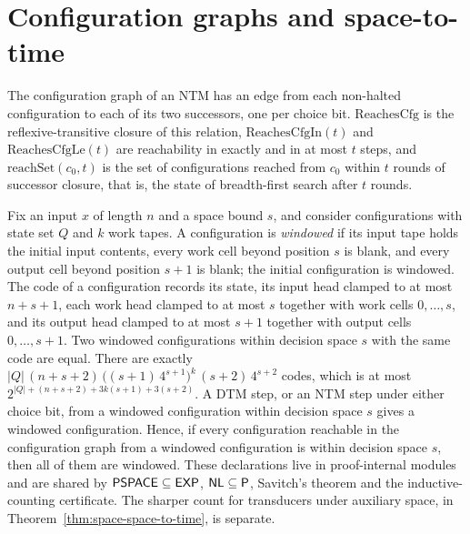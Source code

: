 \section{Configuration graphs and space-to-time}

\begin{definition}
  \label{def:space-config-graph}
  \leanok
  The configuration graph of an NTM has an edge from each non-halted
  configuration to each of its two successors, one per choice bit.
  $\mathrm{ReachesCfg}$ is the reflexive-transitive closure of this relation,
  $\mathrm{ReachesCfgIn}(t)$ and $\mathrm{ReachesCfgLe}(t)$ are reachability in
  exactly and in at most $t$ steps, and $\mathrm{reachSet}(c_0, t)$ is the set
  of configurations reached from $c_0$ within $t$ rounds of successor closure,
  that is, the state of breadth-first search after $t$ rounds.
\end{definition}

\begin{definition}
  \label{def:space-bounded-configs}
  \leanok
  Fix an input $x$ of length $n$ and a space bound $s$, and consider
  configurations with state set $Q$ and $k$ work tapes. A configuration is
  \emph{windowed} if its input tape holds the initial input contents, every
  work cell beyond position $s$ is blank, and every output cell beyond
  position $s + 1$ is blank; the initial configuration is windowed. The code
  of a configuration records its state, its input head clamped to at most
  $n + s + 1$, each work head clamped to at most $s$ together with work cells
  $0, \dots, s$, and its output head clamped to at most $s + 1$ together with
  output cells $0, \dots, s + 1$. Two windowed configurations within decision
  space $s$ with the same code are equal. There are exactly
  $|Q|\,(n + s + 2)\,\bigl((s + 1)\,4^{s + 1}\bigr)^k\,(s + 2)\,4^{s + 2}$
  codes, which is at most $2^{|Q| + (n + s + 2) + 3k(s + 1) + 3(s + 2)}$. A DTM
  step, or an NTM step under either choice bit, from a windowed configuration
  within decision space $s$ gives a windowed configuration. Hence, if every
  configuration reachable in the configuration graph from a windowed
  configuration is within decision space $s$, then all of them are windowed.
  These declarations live in proof-internal modules and are shared by
  $\mathsf{PSPACE} \subseteq \mathsf{EXP}$, $\mathsf{NL} \subseteq \mathsf{P}$, Savitch's
  theorem and the inductive-counting certificate. The sharper count for
  transducers under auxiliary space, in Theorem~\ref{thm:space-space-to-time},
  is separate.
\end{definition}

